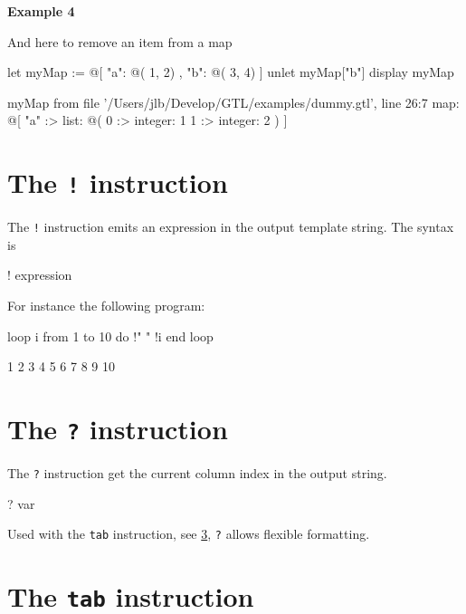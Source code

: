 \documentclass[10pt,openright,twosides,final]{memoir}
\newcommand{\gtlinline}[1]{\colorbox{light-blue}{\lstinline[language=gtl]{#1}}}
\newcommand{\examplen}[1]{\vspace{.75em}\noindent\textbf{Example #1}\vspace{0em}}
\begin{document}
\examplen{4}

\noindent And here to remove an item from a map

\begin{gtl}
let myMap := @[ "a": @( 1, 2) , "b": @( 3, 4) ]
unlet myMap["b"]
display myMap
\end{gtl}

\begin{console}
myMap from file '/Users/jlb/Develop/GTL/examples/dummy.gtl', line 26:7
    map: @[
        "a" :>
            list: @(
                0 :>
                    integer: 1
                1 :>
                    integer: 2
            )
    ]
\end{console}

\section{The \texttt{!} instruction}

The \gtlinline{!} instruction emits an expression in the output template string. The syntax is

\begin{gtl}
! expression
\end{gtl}

\noindent For instance the following program:

\begin{gtl}
loop i from 1 to 10 do
  !" " !i
end loop
\end{gtl}

\begin{templateoutput}
 1 2 3 4 5 6 7 8 9 10
\end{templateoutput}

\section{The \texttt{?} instruction}

The \gtlinline{?} instruction get the current column index in the output string.

\begin{gtl}
? var
\end{gtl}

Used with the \gtlinline{tab} instruction, see \ref{sec:tab}, \gtlinline{?} allows flexible formatting.

\section{The \texttt{tab} instruction}
\label{sec:tab}
\end{document}
